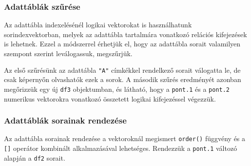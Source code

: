 \documentclass[
]{book}
\newenvironment{Shaded}{\begin{snugshade}}{\end{snugshade}}
\newcommand{\CommentTok}[1]{\textcolor[rgb]{0.56,0.35,0.01}{\textit{#1}}}
\newcommand{\DecValTok}[1]{\textcolor[rgb]{0.00,0.00,0.81}{#1}}
\newcommand{\FloatTok}[1]{\textcolor[rgb]{0.00,0.00,0.81}{#1}}
\newcommand{\NormalTok}[1]{#1}
\newcommand{\OtherTok}[1]{\textcolor[rgb]{0.56,0.35,0.01}{#1}}
\newcommand{\SpecialCharTok}[1]{\textcolor[rgb]{0.00,0.00,0.00}{#1}}
\newcommand{\StringTok}[1]{\textcolor[rgb]{0.31,0.60,0.02}{#1}}
\begin{document}
\hypertarget{adattuxe1bluxe1k-szux171ruxe9se}{%
\subsubsection{Adattáblák szűrése}\label{adattuxe1bluxe1k-szux171ruxe9se}}

Az adattábla indexelésénél logikai vektorokat is használhatunk sorindexvektorban, melyek az adattábla tartalmára vonatkozó relációs kifejezések is lehetnek. Ezzel a módszerrel érhetjük el, hogy az adattábla sorait valamilyen szempont szerint leválogassuk, megszűrjük.

\begin{Shaded}
\end{Shaded}

Az első szűrésünk az adattábla \texttt{"A"} címkékkel rendelkező sorait válogatta le, de csak képernyőn olvashatók ezek a sorok. A második szűrés eredményét azonban megőrizzük egy új \texttt{df3} objektumban, és látható, hogy a \texttt{pont.1} és a \texttt{pont.2} numerikus vektorokra vonatkozó összetett logikai kifejezéssel végezzük.

\hypertarget{adattuxe1bluxe1k-sorainak-rendezuxe9se}{%
\subsubsection{Adattáblák sorainak rendezése}\label{adattuxe1bluxe1k-sorainak-rendezuxe9se}}

Az adattábla sorainak rendezése a vektoroknál megismert \texttt{order()} függvény és a \texttt{{[}{]}} operátor kombinált alkalmazásával lehetséges. Rendezzük a \texttt{pont.1} változó alapján a \texttt{df2} sorait.
\end{document}
